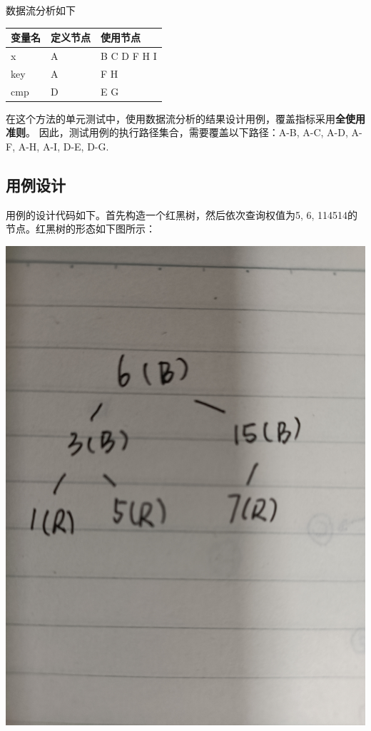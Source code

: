 \documentclass[12pt, a4paper, oneside]{ctexart}
\begin{document}
数据流分析如下

\begin{table}[!h]
    \begin{tabular}{|l|l|l|}
    \hline
    变量名 & 定义节点 & 使用节点 \\ \hline
    x & A & B C D F H I\\ \hline
    key & A & F H \\ \hline
    cmp & D & E G \\ \hline
    \end{tabular}
\end{table}

在这个方法的单元测试中，使用数据流分析的结果设计用例，覆盖指标采用\textbf{全使用准则}。
因此，测试用例的执行路径集合，需要覆盖以下路径：A-B, A-C, A-D, A-F, A-H, A-I, D-E, D-G.

\subsection{用例设计}

用例的设计代码如下。首先构造一个红黑树，然后依次查询权值为5, 6, 114514的节点。红黑树的形态如下图所示：

\includegraphics[scale=0.07]{screenshots/RBT-search.jpg}
\end{document}

